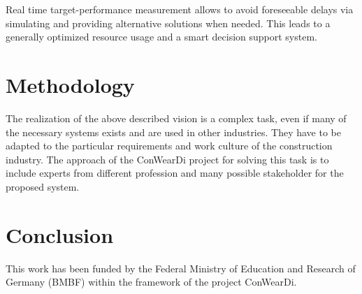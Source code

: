 Real time target-performance measurement allows to avoid foreseeable delays via simulating and providing alternative solutions when needed. This leads to a generally optimized resource usage and a smart decision support system.


\section{Methodology}
The realization of the above described vision is a complex task, even if many of the necessary systems exists and are used in other industries. 
They have to be adapted to the particular requirements and work culture of the construction industry. 
The approach of the ConWearDi project for solving this task is to include experts from different profession and many possible stakeholder for the proposed system.



\section{Conclusion}


\begin{acks}
  This work has been funded by the Federal Ministry of Education and Research of Germany (BMBF) within the framework of the project ConWearDi.
\end{acks}

